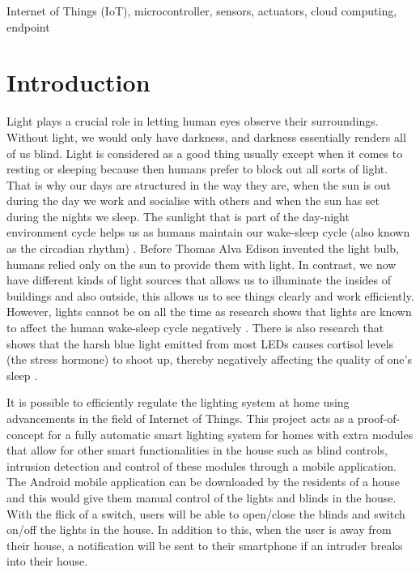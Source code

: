 \documentclass[conference]{IEEEtran}
\begin{document}
\begin{IEEEkeywords}
Internet of Things (IoT), microcontroller, sensors, actuators, cloud computing, endpoint
\end{IEEEkeywords}

\section{Introduction}
Light plays a crucial role in letting human eyes observe their surroundings. Without light, we would only have darkness, and darkness essentially renders all of us blind. Light is considered as a good thing usually except when it comes to resting or sleeping because then humans prefer to block out all sorts of light. That is why our days are structured in the way they are, when the sun is out during the day we work and socialise with others and when the sun has set during the nights we sleep. The sunlight that is part of the day-night environment cycle helps us as humans maintain our wake-sleep cycle (also known as the circadian rhythm) \cite{circadian, sleep_org}. Before Thomas Alva Edison invented the light bulb, humans relied only on the sun to provide them with light. In contrast, we now have different kinds of light sources that allows us to illuminate the insides of buildings and also outside, this allows us to see things clearly and work efficiently. However, lights cannot be on all the time as research shows that lights are known to affect the human wake-sleep cycle negatively \cite{light}. There is also research that shows that the harsh blue light emitted from most LEDs causes cortisol levels (the stress hormone) to shoot up, thereby negatively affecting the quality of one’s sleep \cite{blue_light}. 

It is possible to efficiently regulate the lighting system at home using advancements in the field of Internet of Things. This project acts as a proof-of-concept for a fully automatic smart lighting system for homes with extra modules that allow for other smart functionalities in the house such as blind controls, intrusion detection and control of these modules through a mobile application. The Android mobile application can be downloaded by the residents of a house and this would give them manual control of the lights and blinds in the house. With the flick of a switch, users will be able to open/close the blinds and switch on/off the lights in the house. In addition to this, when the user is away from their house, a notification will be sent to their smartphone if an intruder breaks into their house. 
\end{document}
